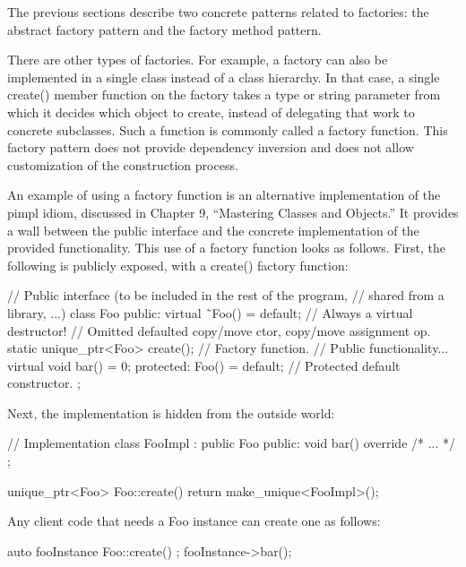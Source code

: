 The previous sections describe two concrete patterns related to factories: the abstract factory pattern and the factory method pattern.

There are other types of factories. For example, a factory can also be implemented in a single class instead of a class hierarchy. In that case, a single create() member function on the factory takes a type or string parameter from which it decides which object to create, instead of delegating that work to concrete subclasses. Such a function is commonly called a factory function. This factory pattern does not provide dependency inversion and does not allow customization of the construction process.

An example of using a factory function is an alternative implementation of the pimpl idiom, discussed in Chapter 9, “Mastering Classes and Objects.” It provides a wall between the public interface and the concrete implementation of the provided functionality. This use of a factory function looks as follows. First, the following is publicly exposed, with a create() factory function:

\begin{cpp}
// Public interface (to be included in the rest of the program,
// shared from a library, ...)
class Foo
{
    public:
        virtual ˜Foo() = default; // Always a virtual destructor!
        // Omitted defaulted copy/move ctor, copy/move assignment op.
        static unique_ptr<Foo> create(); // Factory function.
        // Public functionality...
        virtual void bar() = 0;
    protected:
        Foo() = default; // Protected default constructor.
};
\end{cpp}

Next, the implementation is hidden from the outside world:

\begin{cpp}
// Implementation
class FooImpl : public Foo
{
    public:
    void bar() override { /* ... */ }
};

unique_ptr<Foo> Foo::create()
{
    return make_unique<FooImpl>();
}
\end{cpp}

Any client code that needs a Foo instance can create one as follows:

\begin{cpp}
auto fooInstance { Foo::create() };
fooInstance->bar();
\end{cpp}
